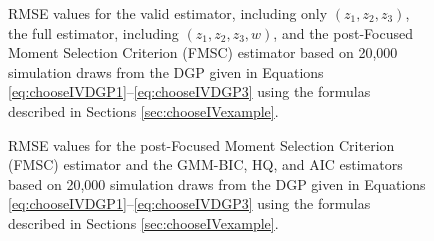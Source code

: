 \begin{figure}[h]
\centering
	
	\caption{RMSE values for the valid estimator, including only $(z_1, z_2, z_3)$, the full estimator, including $(z_1, z_2, z_3, w)$, and the post-Focused Moment Selection Criterion (FMSC) estimator based on 20,000 simulation draws from the DGP given in Equations \ref{eq:chooseIVDGP1}--\ref{eq:chooseIVDGP3} using the formulas described in Sections \ref{sec:chooseIVexample}.}
	\label{fig:chooseIVsim_RMSEbaseline_weak}
\end{figure}

\begin{figure}[h]
\centering
	
	\caption{RMSE values for the post-Focused Moment Selection Criterion (FMSC) estimator and the GMM-BIC, HQ, and AIC estimators based on 20,000 simulation draws from the DGP given in Equations \ref{eq:chooseIVDGP1}--\ref{eq:chooseIVDGP3} using the formulas described in Sections \ref{sec:chooseIVexample}.}
	\label{fig:chooseIVsim_RMSErelMSC_weak}
\end{figure}
